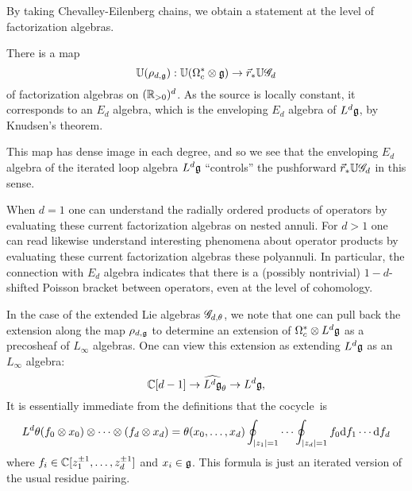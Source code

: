 By taking Chevalley-Eilenberg chains, we obtain a statement at the level of factorization algebras.

\begin{cor}
There is a map
\[
\mathbb U(\rho_{d,\mathfrak g}): \mathbb U(\Omega^*_c \otimes \mathfrak g) \to \vec{r}_* \mathbb U\mathscr G_d
\]
of factorization algebras on $(\mathbb R_{>0})^d$.
As the source is locally constant, it corresponds to an $E_d$ algebra, 
which is the enveloping $E_d$ algebra of $L^d\mathfrak g$, by Knudsen's theorem.
\end{cor}

This map has dense image in each degree, and so we see that the enveloping $E_d$ algebra of the iterated loop algebra $L^d \mathfrak g$ ``controls'' the pushforward $\vec{r}_* \mathbb U\mathscr G_d$ in this sense.


\begin{rmk}
When $d=1$ one can understand the radially ordered products of operators by evaluating these current factorization algebras on nested annuli.
For $d >1$ one can read likewise understand interesting phenomena about operator products by evaluating these current factorization algebras these polyannuli.
In particular, the connection with $E_d$ algebra indicates that there is a (possibly nontrivial) $1-d$-shifted Poisson bracket between operators, even at the level of cohomology.
\end{rmk}

%

In the case of the extended Lie algebras $\mathscr G_{d,\theta}$, we note that one can pull back the extension along the map $\rho_{d,\mathfrak g}$ to determine an extension of $\Omega^*_c \otimes L^d\mathfrak g$ as a precosheaf of $L_\infty$ algebras.
One can view this extension as extending $L^d\mathfrak g$ as an $L_\infty$ algebra:
\[
\mathbb C[d-1] \to \widehat{L^d \mathfrak g}_\theta \to L^d \mathfrak g,
\]
It is essentially immediate from the definitions that the cocycle~is
\[
L^d \theta(f_0 \otimes x_0)\otimes \cdots \otimes (f_d \otimes x_d) = \theta(x_0,\ldots,x_d)  \oint_{|z_1| = 1} \cdots \oint_{|z_d| = 1} f_0 {\rm d} f_1 \cdots {\rm d} f_d
\]
where $f_i \in \mathbb C[z_1^{\pm 1}, \ldots, z_d^{\pm 1}]$ and $x_i \in \mathfrak g$.
This formula is just an iterated version of the usual residue pairing.

